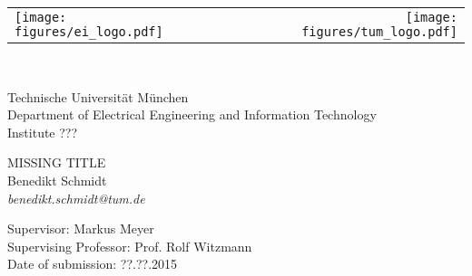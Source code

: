 \begin{titlepage}
	
	\begin{tabularx}{\textwidth}{lXr}
		\texttt{[image: figures/ei\_logo.pdf]} &	& \texttt{[image: figures/tum\_logo.pdf]}
	\end{tabularx}
	\hfill \\[1cm]
	
	\begin{flushleft}
		Technische Universität München \\
		Department of Electrical Engineering and Information Technology \\
		Institute ??? \\[4cm]
	\end{flushleft}
		
	\begin{center}
		\huge
		MISSING TITLE \\[1cm]
		\large
		Benedikt Schmidt \\
		\textit{benedikt.schmidt@tum.de} \\[7cm]
	\end{center}
	
	\begin{flushleft}
		Supervisor: Markus Meyer \\
		Supervising Professor: Prof. Rolf Witzmann \\
		Date of submission: ??.??.2015
	\end{flushleft}
\end{titlepage}